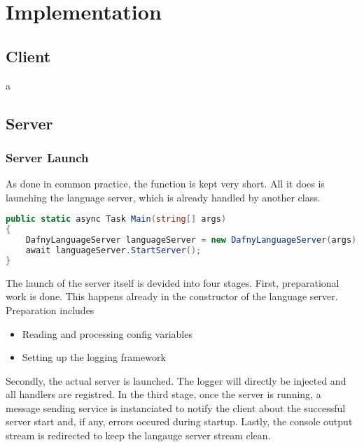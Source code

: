 \section{Implementation}

\subsection{Client}
a



\subsection{Server}


\subsubsection{Server Launch}
As done in common practice, the  function is kept very short. All it does is launching the language server, which is already handled by another class.

\begin{lstlisting}[language=csharp, caption={Main Function}, captionpos=b, label={lst:main}]
public static async Task Main(string[] args)
{
    DafnyLanguageServer languageServer = new DafnyLanguageServer(args);
    await languageServer.StartServer();
}
\end{lstlisting}

The launch of the server itself is devided into four stages. First, preparational work is done. This happens already in the constructor of the language server. Preparation includes
\begin{itemize}
    \item Reading and processing config variables
    \item Setting up the logging framework
\end{itemize}
Secondly, the actual server is launched. The logger will directly be injected and all handlers are registred. In the third stage, once the server is running, a message sending service is instanciated to notify the client about the successful server start and, if any, errors occured during startup. Lastly, the console output stream is redirected to keep the langauge server stream clean.

